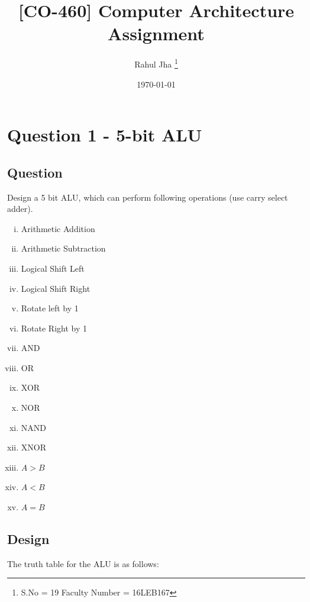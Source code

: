 \documentclass[12pt]{article}
\title{[CO-460] Computer Architecture Assignment}
\author{Rahul Jha \thanks{S.No = 19 Faculty Number = 16LEB167}}
\date{\today}
\begin{document}
\maketitle

\section{Question 1 - 5-bit ALU}

\subsection{Question}
Design a 5 bit ALU, which can perform following operations (use carry select
adder).

\begin{multicols}{2}
  \begin{enumerate}[i)]
      \item Arithmetic Addition
      \item Arithmetic Subtraction
      \item Logical Shift Left
      \item Logical Shift Right
      \item Rotate left by 1
      \item Rotate Right by 1
      \item AND
      \item OR
      \item XOR
      \item NOR
      \item NAND
      \item XNOR
      \item $ A > B $
      \item $ A < B $
      \item $ A = B $
  \end{enumerate}
\end{multicols}

\newpage

\subsection{Design}

The truth table for the ALU is as follows:
\end{document}
